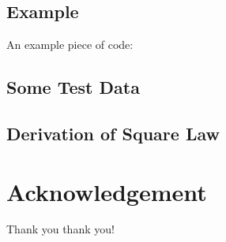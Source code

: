 \documentclass{senior-design}
\begin{document}
\clearpage
\renewcommand*{\UrlFont}{\rmfamily}
\printbibliography[title={References},heading=bibintoc]
\clearpage
\begin{appendices}
\chapter{Example}
An example piece of code:


\section{Some Test Data}

\section{Derivation of Square Law}
\end{appendices}
\clearpage
\backmatter
\chapter*{Acknowledgement}
Thank you thank you!
\end{document}
